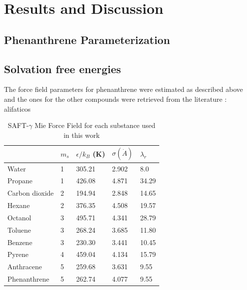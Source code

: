 \chapter{Results and Discussion} %

\label{Chapter5} %

\section{Phenanthrene Parameterization}


\section{Solvation free energies}

The force field parameters for phenanthrene were estimated as described above and the ones for the other compounds were retrieved from the literature \cite{lobanova2016,herdes2015,ervik2016,muller2017}:
alifaticos
\begin{table}[h]
\centering
  \caption{SAFT-$\gamma$ Mie Force Field for each substance used in this work}
  \label{tbl:parameters}
  \begin{tabular}{lllll}
  	\hline
  	               & $m_s$ & $\epsilon/k_{B}$ (K) & $\sigma (\dot{A})$ & $\lambda_r$ \\ \hline
  	Water          & 1     & 305.21               & 2.902              & 8.0         \\
  	Propane        & 1     & 426.08               & 4.871              & 34.29       \\
  	Carbon dioxide & 2     & 194.94               & 2.848              & 14.65       \\
  	Hexane         & 2     & 376.35               & 4.508              & 19.57       \\
  	Octanol        & 3     & 495.71               & 4.341              & 28.79       \\
  	Toluene        & 3     & 268.24               & 3.685              & 11.80       \\
  	Benzene        & 3     & 230.30               & 3.441              & 10.45       \\
  	Pyrene         & 4     & 459.04               & 4.134              & 15.79       \\
  	Anthracene     & 5     & 259.68               & 3.631              & 9.55        \\
  	Phenanthrene   & 5     & 262.74               & 4.077              & 9.55        \\ \hline
  \end{tabular}

\end{table}

